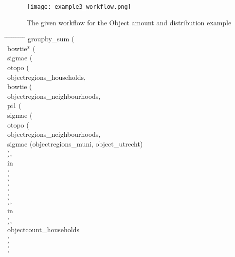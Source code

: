 \documentclass{article}
\begin{document}
\begin{sidewaysfigure}
  \centering
    \texttt{[image: example3\_workflow.png]}
    \caption{The given workflow for the Object amount and distribution example }
    \label{figure:objectAmountWorkflow}
\end{sidewaysfigure}
\begin{tabbing}
\hspace{0.5cm}     \= \hspace{0.5cm}  \= \hspace{0.5cm}  \= \hspace{0.5cm}  \=\hspace{0.5cm}  \=\hspace{0.5cm} \= \hspace{0.5cm}  \= \hspace{0.5cm} \= \hspace{0.5cm} \= \hspace{0.5cm}\kill
groupby\_sum (\\
\>bowtie* (\\
\>\>sigmae (\\
\>\>\>otopo (\\
\>\>\>\>objectregions\_households,\\
\>\>\>\>bowtie (\\
\>\>\>\>\>objectregions\_neighbourhoods,\\
\>\>\>\>\>pi1 (\\
\>\>\>\>\>\>sigmae (\\
\>\>\>\>\>\>\>otopo (\\
\>\>\>\>\>\>\>\>objectregions\_neighbourhoods,\\
\>\>\>\>\>\>\>\>sigmae (objectregions\_muni, object\_utrecht)\\
\>\>\>\>\>\>\>), \\
\>\>\>\>\>\>\>in\\
\>\>\>\>\>\>) \\
\>\>\>\>\>) \\
\>\>\>\>)\\
\>\>\>),\\
\>\>\>in\\
\>\>),\\
\>\>objectcount\_households\\
\>)\\
)\\
\end{tabbing}
\end{document}
